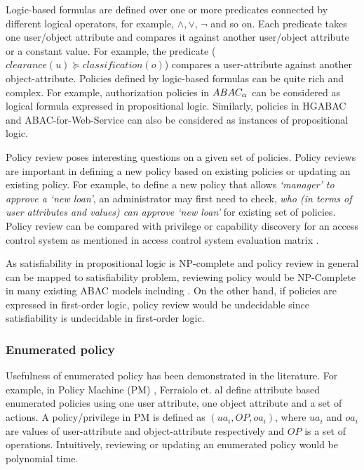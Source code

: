 	Logic-based formulas are defined over one or more predicates connected by different  logical operators, for example, $\land, \lor$, $\lnot$ and so on. Each predicate takes one user/object  attribute and compares it against another user/object attribute or a constant value. For example, the predicate ($clearance(u) \succeq classification(o)$) compares a user-attribute against another object-attribute. Policies defined by logic-based formulas can be quite rich and complex. For example, authorization policies in $ABAC_\alpha${} \cite{abacAlpha}  can be considered as logical formula expressed in propositional logic. Similarly, policies in HGABAC \cite{hgabac} and ABAC-for-Web-Service \cite{abac-for-web-service} can also be considered as instances of propositional logic.
	
		Policy review poses interesting questions on a given set of policies. Policy reviews are important in defining a new policy based on existing policies or updating an existing policy.  For example,  to define a new policy that allows \textit{`manager' to approve a `new loan'}, an administrator may first need to check, \textit{who (in terms of user attributes and values) can approve `new loan'} for existing set of policies. Policy review can be compared with privilege or capability discovery for an access control system as mentioned in access control system evaluation matrix \cite{access-control-evaluation}.
		
	
	As satisfiability in propositional logic is NP-complete and policy review in general can be mapped to satisfiability problem, reviewing policy would be NP-Complete in many existing ABAC models including \cite{abacAlpha,hgabac,abac-for-web-service}. On the other hand, if policies are expressed in first-order logic, policy review would be undecidable since  satisfiability is undecidable in first-order logic.
	
	

	
\subsubsection{Enumerated policy}
	Usefulness of enumerated policy has been demonstrated in the literature. For example, in Policy Machine (PM) \cite{policy-machine}, Ferraiolo et. al define attribute based enumerated policies using one user attribute, one object attribute and a set of actions. A policy/privilege in PM is defined as $(ua_i, OP, oa_i)$, where $ua_i$ and $oa_i$ are values of user-attribute and object-attribute respectively and $OP$ is  a set of operations. Intuitively, reviewing or updating an enumerated policy would be polynomial time.
	
